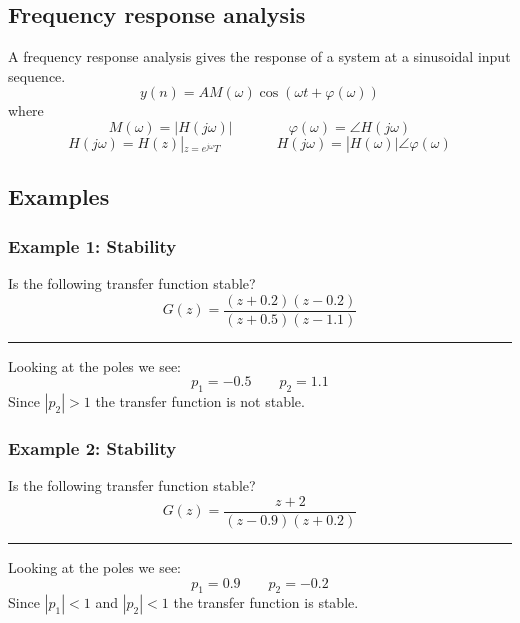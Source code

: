\subsection{Frequency response analysis}
A frequency response analysis gives the response of a system at a sinusoidal input sequence.
$$y(n)=AM(\omega)\cos(\omega t+\varphi(\omega))$$
where
$$M(\omega)=|H(j\omega)| \qquad \qquad\varphi(\omega)=\angle H(j\omega)$$
$$H(j\omega)=H(z)|_{z=e^{j\omega}T}\qquad\qquad H(j\omega)=|H(\omega)|\angle\varphi(\omega)$$

\subsection{Examples}
\subsubsection{Example 1: Stability}
Is the following transfer function stable?
$$G(z)=\frac{(z+0.2)(z-0.2)}{(z+0.5)(z-1.1)}$$

\rule{\textwidth}{0.5pt}

Looking at the poles we see:
$$p_1=-0.5\qquad p_2=1.1$$
Since $|p_2|> 1$ the transfer function is not stable.
\subsubsection{Example 2: Stability}
Is the following transfer function stable?
$$G(z)=\frac{z+2}{(z-0.9)(z+0.2)}$$

\rule{\textwidth}{0.5pt}

Looking at the poles we see:
$$p_1=0.9\qquad p_2=-0.2$$
Since $|p_1|< 1$ and $|p_2|< 1$ the transfer function is stable.
